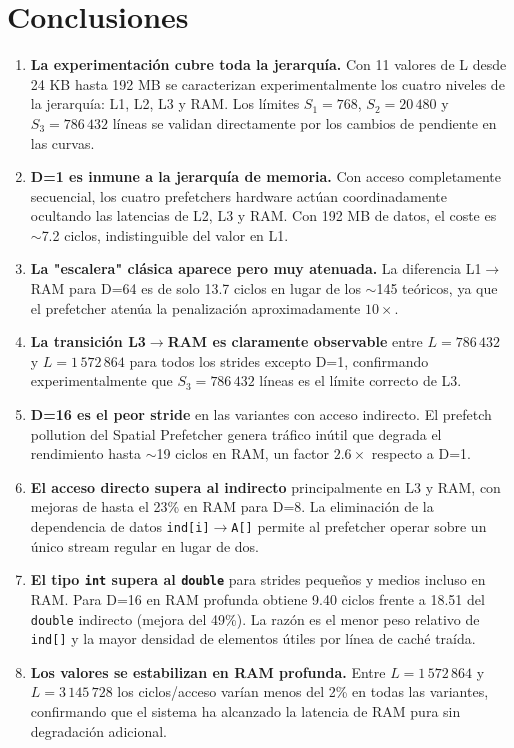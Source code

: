 \documentclass[12pt,a4paper]{article}
\begin{document}
\section{Conclusiones}

\begin{enumerate}[leftmargin=1.5em]
  \item \textbf{La experimentación cubre toda la jerarquía.} Con 11 valores de L desde 24 KB hasta 192 MB se caracterizan experimentalmente los cuatro niveles de la jerarquía: L1, L2, L3 y RAM. Los límites $S_1=768$, $S_2=20\,480$ y $S_3=786\,432$ líneas se validan directamente por los cambios de pendiente en las curvas.

  \item \textbf{D=1 es inmune a la jerarquía de memoria.} Con acceso completamente secuencial, los cuatro prefetchers hardware actúan coordinadamente ocultando las latencias de L2, L3 y RAM. Con 192 MB de datos, el coste es $\sim$7.2 ciclos, indistinguible del valor en L1.

  \item \textbf{La "escalera" clásica aparece pero muy atenuada.} La diferencia L1$\to$RAM para D=64 es de solo 13.7 ciclos en lugar de los $\sim$145 teóricos, ya que el prefetcher atenúa la penalización aproximadamente $10\times$.

  \item \textbf{La transición L3$\to$RAM es claramente observable} entre $L=786\,432$ y $L=1\,572\,864$ para todos los strides excepto D=1, confirmando experimentalmente que $S_3=786\,432$ líneas es el límite correcto de L3.

  \item \textbf{D=16 es el peor stride} en las variantes con acceso indirecto. El prefetch pollution del Spatial Prefetcher genera tráfico inútil que degrada el rendimiento hasta $\sim$19 ciclos en RAM, un factor $2.6\times$ respecto a D=1.

  \item \textbf{El acceso directo supera al indirecto} principalmente en L3 y RAM, con mejoras de hasta el 23\% en RAM para D=8. La eliminación de la dependencia de datos \texttt{ind[i]$\to$A[]} permite al prefetcher operar sobre un único stream regular en lugar de dos.

  \item \textbf{El tipo \texttt{int} supera al \texttt{double}} para strides pequeños y medios incluso en RAM. Para D=16 en RAM profunda obtiene 9.40 ciclos frente a 18.51 del \texttt{double} indirecto (mejora del 49\%). La razón es el menor peso relativo de \texttt{ind[]} y la mayor densidad de elementos útiles por línea de caché traída.

  \item \textbf{Los valores se estabilizan en RAM profunda.} Entre $L=1\,572\,864$ y $L=3\,145\,728$ los ciclos/acceso varían menos del 2\% en todas las variantes, confirmando que el sistema ha alcanzado la latencia de RAM pura sin degradación adicional.
\end{enumerate}
\end{document}
